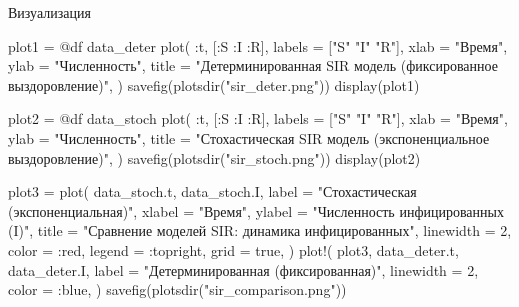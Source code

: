 \documentclass[
  12pt,
  a4paper,
  DIV=11,
  numbers=noendperiod]{scrreprt}
\newenvironment{Shaded}{\begin{snugshade}}{\end{snugshade}}
\newcommand{\ConstantTok}[1]{\textcolor[rgb]{0.56,0.35,0.01}{#1}}
\newcommand{\FloatTok}[1]{\textcolor[rgb]{0.68,0.00,0.00}{#1}}
\newcommand{\FunctionTok}[1]{\textcolor[rgb]{0.28,0.35,0.67}{#1}}
\newcommand{\NormalTok}[1]{\textcolor[rgb]{0.00,0.23,0.31}{#1}}
\newcommand{\OperatorTok}[1]{\textcolor[rgb]{0.37,0.37,0.37}{#1}}
\newcommand{\PreprocessorTok}[1]{\textcolor[rgb]{0.68,0.00,0.00}{#1}}
\newcommand{\StringTok}[1]{\textcolor[rgb]{0.13,0.47,0.30}{#1}}
\begin{document}
Визуализация

\begin{Shaded}
\begin{Highlighting}[]
\NormalTok{plot1 }\OperatorTok{=} \PreprocessorTok{@df}\NormalTok{ data\_deter }\FunctionTok{plot}\NormalTok{(}
    \OperatorTok{:}\NormalTok{t,}
\NormalTok{    [}\OperatorTok{:}\NormalTok{S }\OperatorTok{:}\NormalTok{I }\OperatorTok{:}\NormalTok{R],}
\NormalTok{    labels }\OperatorTok{=}\NormalTok{ [}\StringTok{"S"} \StringTok{"I"} \StringTok{"R"}\NormalTok{],}
\NormalTok{    xlab }\OperatorTok{=} \StringTok{"Время"}\NormalTok{,}
\NormalTok{    ylab }\OperatorTok{=} \StringTok{"Численность"}\NormalTok{,}
\NormalTok{    title }\OperatorTok{=} \StringTok{"Детерминированная SIR модель (фиксированное выздоровление)"}\NormalTok{,}
\NormalTok{)}
\FunctionTok{savefig}\NormalTok{(}\FunctionTok{plotsdir}\NormalTok{(}\StringTok{"sir\_deter.png"}\NormalTok{))}
\FunctionTok{display}\NormalTok{(plot1)}

\NormalTok{plot2 }\OperatorTok{=} \PreprocessorTok{@df}\NormalTok{ data\_stoch }\FunctionTok{plot}\NormalTok{(}
    \OperatorTok{:}\NormalTok{t,}
\NormalTok{    [}\OperatorTok{:}\NormalTok{S }\OperatorTok{:}\NormalTok{I }\OperatorTok{:}\NormalTok{R],}
\NormalTok{    labels }\OperatorTok{=}\NormalTok{ [}\StringTok{"S"} \StringTok{"I"} \StringTok{"R"}\NormalTok{],}
\NormalTok{    xlab }\OperatorTok{=} \StringTok{"Время"}\NormalTok{,}
\NormalTok{    ylab }\OperatorTok{=} \StringTok{"Численность"}\NormalTok{,}
\NormalTok{    title }\OperatorTok{=} \StringTok{"Стохастическая SIR модель (экспоненциальное выздоровление)"}\NormalTok{,}
\NormalTok{)}
\FunctionTok{savefig}\NormalTok{(}\FunctionTok{plotsdir}\NormalTok{(}\StringTok{"sir\_stoch.png"}\NormalTok{))}
\FunctionTok{display}\NormalTok{(plot2)}

\NormalTok{plot3 }\OperatorTok{=} \FunctionTok{plot}\NormalTok{(}
\NormalTok{    data\_stoch.t, data\_stoch.I,}
\NormalTok{    label }\OperatorTok{=} \StringTok{"Стохастическая (экспоненциальная)"}\NormalTok{,}
\NormalTok{    xlabel }\OperatorTok{=} \StringTok{"Время"}\NormalTok{,}
\NormalTok{    ylabel }\OperatorTok{=} \StringTok{"Численность инфицированных (I)"}\NormalTok{,}
\NormalTok{    title }\OperatorTok{=} \StringTok{"Сравнение моделей SIR: динамика инфицированных"}\NormalTok{,}
\NormalTok{    linewidth }\OperatorTok{=} \FloatTok{2}\NormalTok{,}
\NormalTok{    color }\OperatorTok{=} \OperatorTok{:}\NormalTok{red,}
\NormalTok{    legend }\OperatorTok{=} \OperatorTok{:}\NormalTok{topright,}
\NormalTok{    grid }\OperatorTok{=} \ConstantTok{true}\NormalTok{,}
\NormalTok{)}
\FunctionTok{plot!}\NormalTok{(}
\NormalTok{    plot3,}
\NormalTok{    data\_deter.t, data\_deter.I,}
\NormalTok{    label }\OperatorTok{=} \StringTok{"Детерминированная (фиксированная)"}\NormalTok{,}
\NormalTok{    linewidth }\OperatorTok{=} \FloatTok{2}\NormalTok{,}
\NormalTok{    color }\OperatorTok{=} \OperatorTok{:}\NormalTok{blue,}
\NormalTok{)}
\FunctionTok{savefig}\NormalTok{(}\FunctionTok{plotsdir}\NormalTok{(}\StringTok{"sir\_comparison.png"}\NormalTok{))}
\end{Highlighting}
\end{Shaded}
\end{document}
